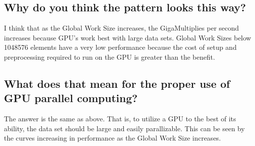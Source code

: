 \documentclass[onecolumn,draftclsnofoot, 10pt, compsoc]{IEEEtran}
\begin{document}
	
	
	
	
	
	
	
	\subsection{Why do you think the pattern looks this way?}
		I think that as the Global Work Size increases, the GigaMultiplies per second increases because GPU's work best with large data sets.
		Global Work Sizes below 1048576 elements have a very low performance because the cost of setup and preprocessing required to run on the GPU is greater than the benefit.
	
	
	
	
	
	
	
	
	\subsection{What does that mean for the proper use of GPU parallel computing?}
		The answer is the same as above. That is, to utilize a GPU to the best of its ability, the data set should be large and easily parallizable. This can be seen by the curves increasing in performance as the Global Work Size increases.
\end{document}
